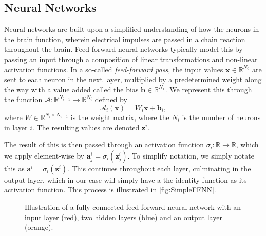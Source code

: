 \subsection{Neural Networks}
Neural networks are built upon a simplified understanding of how the neurons in the brain function, wherein electrical impulses are passed in a chain reaction throughout the brain.
Feed-forward neural networks typically model this by passing an input through a composition of linear transformations and non-linear activation functions.
In a so-called \textit{feed-forward pass}, the input values $\boldsymbol{x} \in \mathbb{R}^{N_0}$ are sent to each neuron in the next layer, multiplied by a predetermined weight along the way with a value added called the bias $\boldsymbol{b} \in \mathbb{R}^{N_1}$.
We represent this through the function $\mathcal{A} : \mathbb{R}^{N_{i-1}} \to \mathbb{R}^{N_{i}}$ defined by
\begin{equation}
    \mathcal{A}_i(\boldsymbol{x}) = W_i \boldsymbol{x} + \boldsymbol{b}_i,
\end{equation}
where $W \in \mathbb{R}^{N_i \times N_{i-1}}$ is the weight matrix, where the $N_i$ is the number of neurons in layer $i$.
The resulting values are denoted $\boldsymbol{z}^i$.

The result of this is then passed through an activation function $\sigma_i : \mathbb{R} \to \mathbb{R}$, which we apply element-wise by $\boldsymbol{a}^i_j = \sigma_i (\boldsymbol{z}^i_j)$.
To simplify notation, we simply notate this as $\boldsymbol{a}^i = \sigma_i(\boldsymbol{z}^i)$.
This continues throughout each layer, culminating in the output layer, which in our case will simply have a the identity function as its activation function.
This process is illustrated in \autoref{fig:SimpleFFNN}.

\begin{figure}[h]
\centering

\caption{Illustration of a fully connected feed-forward neural network with an input layer (red), two hidden layers (blue) and an output layer (orange).}
\label{fig:SimpleFFNN}
\end{figure}

